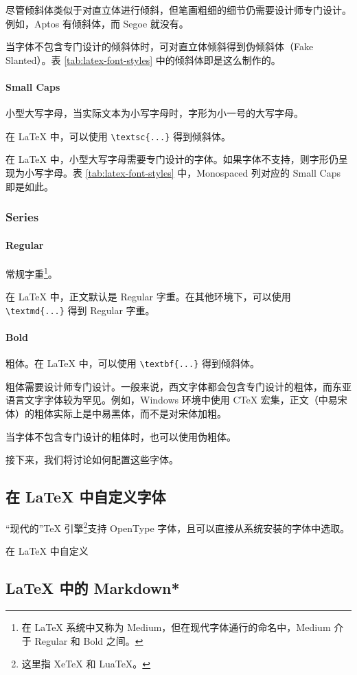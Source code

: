 \documentclass[a4paper,fontset=none]{ctexart}
\begin{document}
尽管倾斜体类似于对直立体进行倾斜，但笔画粗细的细节仍需要设计师专门设计。例如，Aptos 有倾斜体，而 Segoe 就没有。

当字体不包含专门设计的倾斜体时，可对直立体倾斜得到伪倾斜体（Fake Slanted）。表 \ref{tab:latex-font-styles} 中的倾斜体即是这么制作的。

\paragraph{Small Caps}

小型大写字母，当实际文本为小写字母时，字形为小一号的大写字母。

在 LaTeX 中，可以使用 \verb|\textsc{...}| 得到倾斜体。

在 LaTeX 中，小型大写字母需要专门设计的字体。如果字体不支持，则字形仍呈现为小写字母。表 \ref{tab:latex-font-styles} 中，Monospaced 列对应的 Small Caps 即是如此。

\subsubsection{Series}

\paragraph{Regular}

常规字重\footnote{在 LaTeX 系统中又称为 Medium，但在现代字体通行的命名中，Medium 介于 Regular 和 Bold 之间。}。

在 LaTeX 中，正文默认是 Regular 字重。在其他环境下，可以使用 \verb|\textmd{...}| 得到 Regular 字重。

\paragraph{Bold}

粗体。在 LaTeX 中，可以使用 \verb|\textbf{...}| 得到倾斜体。

粗体需要设计师专门设计。一般来说，西文字体都会包含专门设计的粗体，而东亚语言文字字体较为罕见。例如，Windows 环境中使用 CTeX 宏集，正文（中易宋体）的粗体实际上是中易黑体，而不是对宋体加粗。


当字体不包含专门设计的粗体时，也可以使用伪粗体。

接下来，我们将讨论如何配置这些字体。

\subsection{在 LaTeX 中自定义字体}

“现代的”TeX 引擎\footnote{这里指 XeTeX 和 LuaTeX。}支持 OpenType 字体，且可以直接从系统安装的字体中选取。

在 LaTeX 中自定义
\subsection{LaTeX 中的 Markdown*}
\end{document}
